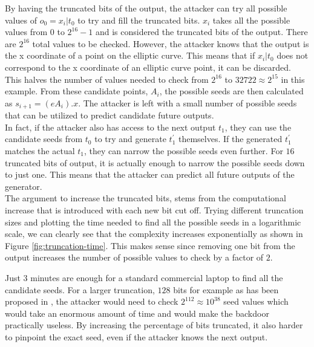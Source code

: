 By having the truncated bits of the output, the attacker can try all possible values of $o_0 = x_i | t_0$ to try and fill the truncated bits. $x_i$ takes all the possible values from $0$ to $2^{16} - 1$ and is considered the truncated bits of the output. There are $2^{16}$ total values to be checked. However, the attacker knows that the output is the x coordinate of a point on the elliptic curve. This means that if $x_i | t_0$ does not correspond to the x coordinate of an elliptic curve point, it can be discarded. This halves the number of values needed to check from $2^{16}$ to $32722 \approx 2^{15}$ in this example. From these candidate points, $A_i$, the possible seeds are then calculated as $s_{i + 1} = (eA_i).x$. The attacker is left with a small number of possible seeds that can be utilized to predict candidate future outputs.
\\

In fact, if the attacker also has access to the next output $t_1$, they can use the candidate seeds from $t_0$ to try and generate $t_1^\prime$ themselves. If the generated $t_1^\prime$ matches the actual $t_1$, they can narrow the possible seeds even further. For $16$ truncated bits of output, it is actually enough to narrow the possible seeds down to just one. This means that the attacker can predict all future outputs of the generator.
\\

The argument to increase the truncated bits, stems from the computational increase that is introduced with each new bit cut off. Trying different truncation sizes and plotting the time needed to find all the possible seeds in a logarithmic scale, we can clearly see that the complexity increases exponentially as shown in Figure \ref{fig:truncation-time}. This makes sense since removing one bit from the output increases the number of possible values to check by a factor of $2$.


Just 3 minutes are enough for a standard commercial laptop to find all the candidate seeds. For a larger truncation, $128$ bits for example as has been proposed in \cite{backdoor}, the attacker would need to check $2^{112} \approx 10^{38}$ seed values which would take an enormous amount of time and would make the backdoor practically useless. By increasing the percentage of bits truncated, it also harder to pinpoint the exact seed, even if the attacker knows the next output.
\\


